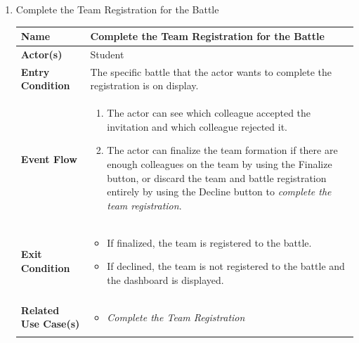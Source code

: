 \begin{enumerate}
\newpage

\item Complete the Team Registration for the Battle
\begin{center}
    \begin{tabular}{ | m{10em} | m{10cm}| } 
      \hline
      \textbf{Name} & Complete the Team Registration for the Battle  \\ 
      \hline
      \textbf{Actor(s)} & Student \\ 
      \hline
      \textbf{Entry Condition} & The specific battle that the actor wants to complete the registration is on display. \\ 
      \hline
      \textbf{Event Flow} & 
          \begin{enumerate}[(1)]
              \item The actor can see which colleague accepted the invitation and which colleague rejected it.
              \item The actor can finalize the team formation if there are enough colleagues on the team by using the Finalize button, or discard the team and battle registration entirely by using the Decline button to \textit{complete the team registration}.
          \end{enumerate}
      \\ 
      \hline
      \textbf{Exit Condition} & 
      \begin{itemize}
          \item If finalized, the team is registered to the battle.
          \item If declined, the team is not registered to the battle and the dashboard is displayed.
      \end{itemize}\\ 
      \hline
      \textbf{Related Use Case(s)} & 
      \begin{itemize}
          \item \textit{Complete the Team Registration}
      \end{itemize}
          \\ 
      \hline
    \end{tabular}
        \label{tbl:uc12}
\end{center}



\end{enumerate}
